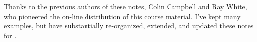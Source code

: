 Thanks to the previous authors of these notes, Colin Campbell and Ray White,
who pioneered the on-line distribution of this course material.
I've kept many examples, but have substantially re-organized, extended, and
updated these notes for \LaTeXe .
